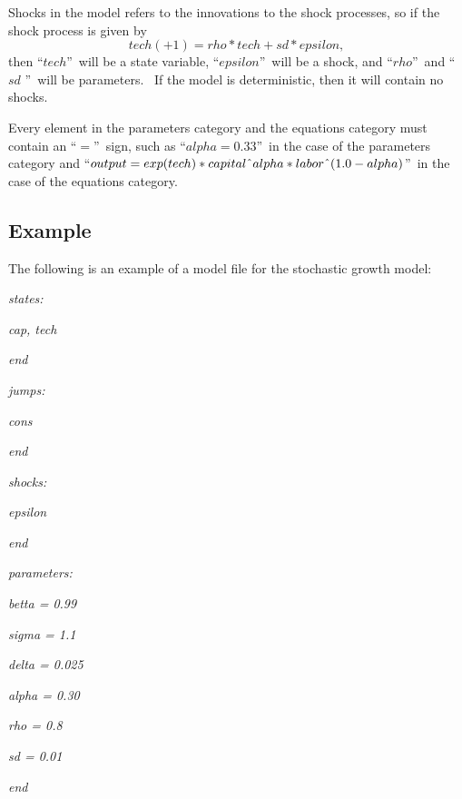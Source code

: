 \documentclass[notitlepage,11pt]{article}
\begin{document}
Shocks in the model refers to the innovations to the shock processes, so if
the shock process is given by%
\begin{equation*}
tech(+1)=rho\ast tech+sd\ast epsilon,
\end{equation*}%
then \textquotedblleft $tech$\textquotedblright\ will be a state variable,
\textquotedblleft $epsilon$\textquotedblright\ will be a shock, and
\textquotedblleft $rho$\textquotedblright\ and \textquotedblleft $sd$%
\textquotedblright\ will be parameters. \ If the model is deterministic,
then it will contain no shocks.

Every element in the parameters category and the equations category must
contain an \textquotedblleft $=$\textquotedblright\ sign, such as
\textquotedblleft $alpha=0.33$\textquotedblright\ in the case of the
parameters category and \textquotedblleft $output=exp(tech)\ast capital%
\symbol{94}alpha\ast labor\symbol{94}(1.0-alpha)$\textquotedblright\ in the
case of the equations category.

\subsection{Example}

The following is an example of a model file for the stochastic growth model:

\bigskip

\textit{states:}

\textit{cap, tech}

\textit{end}

\textit{\bigskip }

\textit{jumps:}

\textit{cons}

\textit{end}

\textit{\bigskip }

\textit{shocks:}

\textit{epsilon}

\textit{end}

\textit{\bigskip }

\textit{parameters:}

\textit{betta = 0.99}

\textit{sigma = 1.1}

\textit{delta = 0.025}

\textit{alpha = 0.30}

\textit{rho = 0.8}

\textit{sd = 0.01}

\textit{end}
\end{document}
